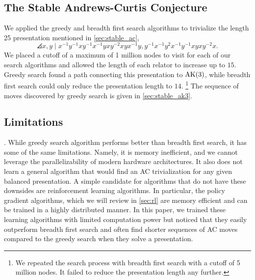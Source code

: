 \subsection{The Stable Andrews-Curtis Conjecture}
We applied the greedy and breadth first search algorithms to trivialize the length 25 presentation mentioned in \autoref{sec:stable_ac},
\[
\angles{ x, y \mid 
x^{-1}y^{-1}xy^{-1}x^{-1}yxy^{-2}xyx^{-1}y, 
y^{-1}x^{-1}y^2x^{-1}y^{-1}xyxy^{-2}x }.
\]
We placed a cutoff of a maximum of 1 million nodes to visit for each of our search algorithms and allowed the length of each relator to increase up to $15$. Greedy search found a path connecting this presentation to $\text{AK}(3)$, while breadth first search could only reduce the presentation length to $14$. 
\footnote{We repeated the search process with breadth first search with a cutoff of 5 million nodes. It failed to reduce the presentation length any further.}
The sequence of moves discovered by greedy search is given in \autoref{sec:stable_ak3}.

\subsection{Limitations}. While greedy search algorithm performs better than breadth first search, it has some of the same limitations. Namely, it is memory inefficient, and we cannot leverage the parallelizability of modern hardware architectures. It also does not learn a general algorithm that would find an AC trivialization for any given balanced presentation. A simple candidate for algorithms that do not have these downsides are reinforcement learning algorithms. In particular, the policy gradient algorithms, which we will review in \autoref{sec:rl} are memory efficient and can be trained in a highly distributed manner. In this paper, we trained these learning algorithms with limited computation power but noticed that they easily outperform breadth first search and often find shorter sequences of AC moves compared to the greedy search when they solve a presentation. 

